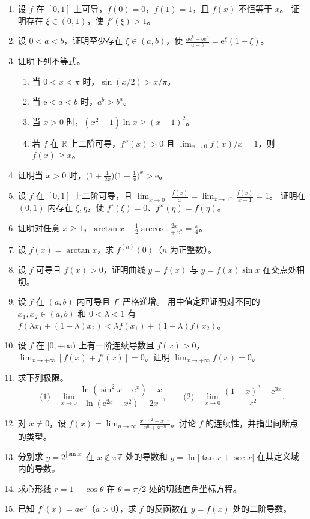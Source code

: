 \documentclass[UTF8,a4paper,zihao=-4,fontset=fandol]{ctexart}
\begin{document}
\begin{enumerate}[start=50]
验证拉格朗日中值定理的条件，并求满足定理等式的所有 $\xi$。
\item 设 $f$ 在 $[0,1]$ 上可导，$f(0)=0$，$f(1)=1$，且 $f(x)$ 不恒等于 $x$。
证明存在 $\xi\in(0,1)$，使 $f'(\xi)>1$。
\item 设 $0<a<b$，证明至少存在 $\xi\in(a,b)$，使
$\displaystyle\frac{a\mathrm e^b-b\mathrm e^a}{a-b}=\mathrm e^\xi(1-\xi)$。
\item 证明下列不等式。
\begin{enumerate}[label=(\arabic*),nosep]
\item 当 $0<x<\pi$ 时，$\sin(x/2)>x/\pi$。
\item 当 $\mathrm e<a<b$ 时，$a^b>b^a$。
\item 当 $x>0$ 时，$(x^2-1)\ln x\ge(x-1)^2$。
\item 若 $f$ 在 $\mathbb R$ 上二阶可导，$f''(x)>0$ 且 $\lim_{x\to0}f(x)/x=1$，则 $f(x)\ge x$。
\end{enumerate}
\item 证明当 $x>0$ 时，$\big(1+\frac1{2x}\big)\big(1+\frac1x\big)^x>\mathrm e$。
\item 设 $f$ 在 $[0,1]$ 上二阶可导，且
$\displaystyle\lim_{x\to0^+}\frac{f(x)}x=\lim_{x\to1^-}\frac{f(x)}{x-1}=1$。
证明在 $(0,1)$ 内存在 $\xi,\eta$，使 $f'(\xi)=0$、$f''(\eta)=f(\eta)$。
\item 证明对任意 $x\ge1$，$\arctan x-\frac12\arccos\frac{2x}{1+x^2}=\frac\pi4$。
\item 设 $f(x)=\arctan x$，求 $f^{(n)}(0)$（$n$ 为正整数）。
\item 设 $f$ 可导且 $f(x)>0$，证明曲线 $y=f(x)$ 与 $y=f(x)\sin x$ 在交点处相切。
\item 设 $f$ 在 $(a,b)$ 内可导且 $f'$ 严格递增。
用中值定理证明对不同的 $x_1,x_2\in(a,b)$ 和 $0<\lambda<1$ 有
$f(\lambda x_1+(1-\lambda)x_2)<\lambda f(x_1)+(1-\lambda)f(x_2)$。
\item 设 $f$ 在 $[0,+\infty)$ 上有一阶连续导数且 $f(x)>0$，
$\displaystyle\lim_{x\to+\infty}[f(x)+f'(x)]=0$。证明 $\displaystyle\lim_{x\to+\infty}f(x)=0$。
\item 求下列极限。
\[
 \text{(1)}\quad \lim_{x\to0}\frac{\ln(\sin^2x+\mathrm e^x)-x}{\ln(\mathrm e^{2x}-x^2)-2x},
 \qquad
 \text{(2)}\quad \lim_{x\to0}\frac{(1+x)^3-\mathrm e^{3x}}{x^2}.
\]
\item 对 $x\ne0$，设 $\displaystyle f(x)=\lim_{n\to\infty}
\frac{x^{n+2}-x^{-n}}{x^n+x^{-n}}$。讨论 $f$ 的连续性，并指出间断点的类型。
\item 分别求 $y=2^{|\sin x|}$ 在 $x\notin\pi\mathbb{Z}$ 处的导数和
$y=\ln|\tan x+\sec x|$ 在其定义域内的导数。
\item 求心形线 $r=1-\cos\theta$ 在 $\theta=\pi/2$ 处的切线直角坐标方程。
\item 已知 $f'(x)=a\mathrm{e}^x$（$a>0$），求 $f$ 的反函数在 $y=f(x)$ 处的二阶导数。
\end{enumerate}
\end{document}
